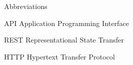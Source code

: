 
\begin{dictionary}{Abbreviations}
\item[API]	Application Programming Interface
\item[REST]	Representational State Transfer
\item[HTTP]	Hypertext Transfer Protocol
\end{dictionary}
